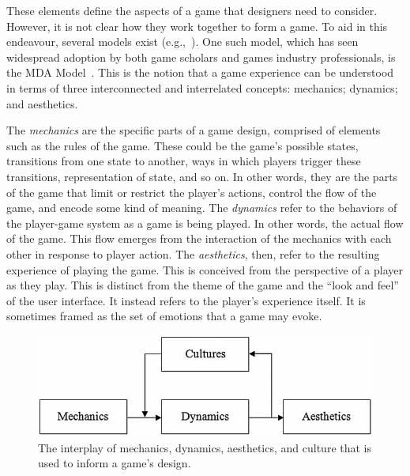 \documentclass{sig-alternate-05-2015}
\begin{document}
These elements define the aspects of a game that designers need to consider. However, it is not clear how they work together to form a game. To aid in this endeavour, several models exist (e.g.,~\cite{schell2014art, hunicke2004mda}). One such model, which has seen widespread adoption by both game scholars and games industry professionals, is the MDA Model~\cite{hunicke2004mda}. This is the notion that a game experience can be understood in terms of three interconnected and interrelated concepts: mechanics; dynamics; and aesthetics.



The {\em mechanics} are the specific parts of a game design, comprised of elements such as the rules of the game. These could be the game's possible states, transitions from one state to another, ways in which players trigger these transitions, representation of state, and so on. In other words, they are the parts of the game that limit or restrict the player's actions, control the flow of the game, and encode some kind of meaning. The {\em dynamics} refer to the behaviors of the player-game system as a game is being played. In other words, the actual flow of the game. This flow emerges from the interaction of the mechanics with each other in response to player action. The {\em aesthetics}, then, refer to the resulting experience of playing the game. This is conceived from the perspective of a player as they play. This is distinct from the theme of the game and the ``look and feel'' of the user interface. It instead refers to the player's experience itself. It is sometimes framed as the set of emotions that a game may evoke.







\begin{figure}[tb]
\centering
\includegraphics[width=\linewidth]{images/image01.png}
\caption{The interplay of mechanics, dynamics, aesthetics, and culture that is used to inform a game's design.}
\label{figure:mdaculture}
\end{figure}
\end{document}
